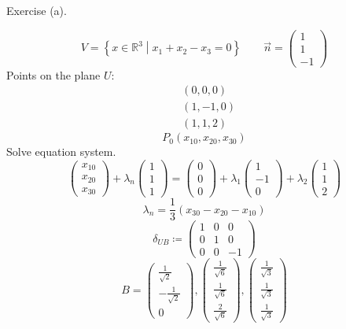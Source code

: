 \documentclass[a4paper]{article}
\theoremstyle{definition}
\newcommand\set[1]{\left\{#1\right\}}
\begin{document}
Exercise (a).

\[ V = \set{x \in \mathbb R^3 \middle| x_1 + x_2 - x_3 = 0} \qquad \vec n = \begin{pmatrix} 1 \\ 1 \\ -1 \end{pmatrix} \]
Points on the plane $U$:
\begin{align*}
  &(0, 0, 0) \\
  &(1, -1, 0) \\
  &(1, 1, 2)
\end{align*}
\[ P_0(x_{10}, x_{20}, x_{30}) \]
Solve equation system.
\[
  \begin{pmatrix} x_{10} \\ x_{20} \\ x_{30} \end{pmatrix} + \lambda_n \begin{pmatrix} 1 \\ 1 \\ 1 \end{pmatrix}
  = \begin{pmatrix} 0 \\ 0 \\ 0 \end{pmatrix} + \lambda_1 \begin{pmatrix} 1 \\ -1 \\ 0 \end{pmatrix} + \lambda_2 \begin{pmatrix} 1 \\ 1 \\ 2 \end{pmatrix}
\]
\[ \lambda_n = \frac13 (x_{30} - x_{20} - x_{10}) \]
\[ \delta_{UB} \coloneqq \begin{pmatrix} 1&0&0 \\ 0&1&0 \\ 0&0&-1 \end{pmatrix} \]
\[ B = \begin{pmatrix} \frac{1}{\sqrt2} \\ -\frac1{\sqrt2} \\ 0 \end{pmatrix}, \begin{pmatrix} \frac1{\sqrt6} \\ \frac1{\sqrt6} \\ \frac2{\sqrt6} \end{pmatrix}, \begin{pmatrix} \frac1{\sqrt3} \\ \frac1{\sqrt{3}} \\ \frac{1}{\sqrt{3}} \end{pmatrix} \]
\end{document}
